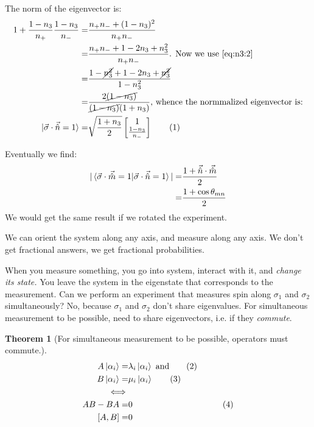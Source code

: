 \documentclass[]{article}
\newcommand\numberthis{\addtocounter{equation}{1}\tag{\theequation}}
\newtheorem{thm}{Theorem}
\begin{document}
The norm of the eigenvector is:
 \begin{align*}
 	1+\frac{1-n_3}{n_+}\frac{1-n_3}{n_-}=& \frac{n_+n_- + (1-n_3)^2 }{n_+n_-}\\ 
 	=&\frac{n_+n_- + 1 -2 n_3 + n_3^2}{n_+n_-} \text{. Now we use \eqref{eq:n3:2}}\\
 	=& \frac{1-\cancel{n_3^2}+1 - 2n_3 +\cancel{n_3^2}}{1-n_3^2}\\
 	=& \frac{2\cancel{(1-n_3)}}{\cancel{(1-n_3)}(1+n_3)} \text{, whence the normmalized eigenvector is:}\\
 	\ket{\vec{\sigma} \cdot \vec{\hat{n}}=1} =& \sqrt{\frac{1+n_3}{2}} \begin{bmatrix}
 		1\\\frac{1-n_3}{n_-}
 	\end{bmatrix} \numberthis \label{eq:eigenvector:normalized}
 \end{align*}

Eventually we find:
\begin{align*}
	\vert \braket{\vec{\sigma} \cdot \vec{\hat{m}}=1\vert\vec{\sigma} \cdot \vec{\hat{n}}=1}\vert =& \frac{1 + \vec{\hat{n}} \cdot \vec{\hat{m}}}{2}\\
	=& \frac{1 + \cos{\theta_{mn}}}{2}
\end{align*}
We would get the same result if we rotated the experiment.

We can orient the system along any axis, and measure along any axis. We don't get fractional answers, we get fractional probabilities.

When you measure something, you go into system, interact with it, and \emph{change its state.} You leave the system in the eigenstate that corresponds to the measurement. Can we perform an experiment that measures spin along $\sigma_1$ and $\sigma_2$ simultaneously? No, because $\sigma_1$ and $\sigma_2$ don't share eigenvalues. For simultaneous measurement to be possible, need to share eigenvectors, i.e. if they \emph{commute}.

\begin{thm}[For simultaneous measurement to be possible, operators must commute.]
	\begin{align*}
			A\ket{\alpha_i} =& \lambda_i \ket{\alpha_i} \text{ and} \numberthis \label{eq:simultaneous1}\\
			B\ket{\alpha_i} =& \mu_i \ket{\alpha_i} \numberthis\label{eq:simultaneous2}\\
			\iff &\\
			AB - BA =& 0& \numberthis \label{eq:simultaneous3}\\
			[A,B] =& 0
	\end{align*}
\end{thm}
\end{document}

